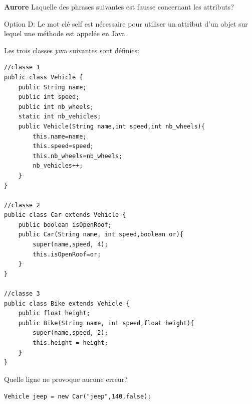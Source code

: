 \begin{Exercice}[5 minutes]\textbf{Aurore}
Laquelle des phrases suivantes est fausse concernant les attributs?


\begin{solution}
Option D: Le mot clé self est nécessaire pour utiliser un attribut d'un objet sur lequel une méthode est appelée en Java.
\end{solution}

Les trois classes java suivantes sont définies:

\begin{lstlisting}[style=javastyle]
//classe 1
public class Vehicle {
    public String name;
    public int speed;
    public int nb_wheels;
    static int nb_vehicles;
    public Vehicle(String name,int speed,int nb_wheels){
        this.name=name;
        this.speed=speed;
        this.nb_wheels=nb_wheels;
        nb_vehicles++;
    }
}

//classe 2
public class Car extends Vehicle {
    public boolean isOpenRoof;
    public Car(String name, int speed,boolean or){
        super(name,speed, 4);
        this.isOpenRoof=or;
    }
}

//classe 3
public class Bike extends Vehicle {
    public float height;
    public Bike(String name, int speed,float height){
        super(name,speed, 2);
        this.height = height;
    }
}
\end{lstlisting}

Quelle ligne ne provoque aucune erreur?


\begin{solution}
\texttt{Vehicle jeep = new Car("jeep",140,false);}
\end{solution}

\end{Exercice}

